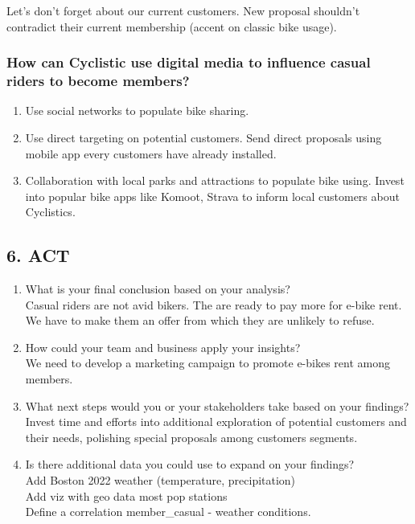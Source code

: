 \documentclass[
]{article}
\begin{document}
Let's don't forget about our current customers. New proposal shouldn't
contradict their current membership (accent on classic bike usage).

\hypertarget{how-can-cyclistic-use-digital-media-to-influence-casual-riders-to-become-members}{%
\subsubsection{How can Cyclistic use digital media to influence casual
riders to become
members?}\label{how-can-cyclistic-use-digital-media-to-influence-casual-riders-to-become-members}}

\begin{enumerate}
\def\labelenumi{\arabic{enumi}.}
\item
  Use social networks to populate bike sharing.
\item
  Use direct targeting on potential customers. Send direct proposals
  using mobile app every customers have already installed.
\item
  Collaboration with local parks and attractions to populate bike using.
  Invest into popular bike apps like Komoot, Strava to inform local
  customers about Cyclistics.
\end{enumerate}

\hypertarget{act}{%
\subsection{6. ACT}\label{act}}

\begin{enumerate}
\def\labelenumi{\arabic{enumi}.}
\item
  What is your final conclusion based on your analysis?\\
  Casual riders are not avid bikers. The are ready to pay more for
  e-bike rent.\\
  We have to make them an offer from which they are unlikely to refuse.
\item
  How could your team and business apply your insights?\\
  We need to develop a marketing campaign to promote e-bikes rent among
  members.
\item
  What next steps would you or your stakeholders take based on your
  findings?\\
  Invest time and efforts into additional exploration of potential
  customers and their needs, polishing special proposals among customers
  segments.
\item
  Is there additional data you could use to expand on your findings?\\
  Add Boston 2022 weather (temperature, precipitation)\\
  Add viz with geo data most pop stations\\
  Define a correlation member\_casual - weather conditions.
\end{enumerate}
\end{document}
